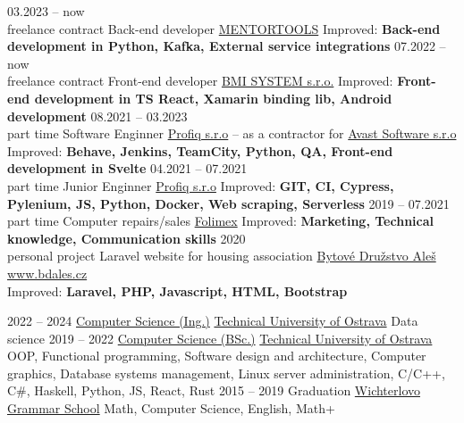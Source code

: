 \documentclass[9pt]{developercv} %
\begin{document}
\begin{entrylist}
        \entry
		{03.2023 -- now\\\footnotesize{freelance contract}}
		{Back-end developer}
		{\href{https://mentortools.com/}{MENTORTOOLS}}
		{Improved: \textbf{Back-end development in Python, Kafka, External service integrations}}
        \entry
		{07.2022 -- now\\\footnotesize{freelance contract}}
		{Front-end developer}
		{\href{http://www.bmisystem.cz/}{BMI SYSTEM s.r.o.}}
		{Improved: \textbf{Front-end development in TS React, Xamarin binding lib, Android development}}
	\entry
		{08.2021 -- 03.2023\\\footnotesize{part time}}
		{Software Enginner}
		{\href{https://www.profiq.com/}{Profiq s.r.o} -- as a contractor for \href{https://www.avast.com/index}{Avast Software s.r.o}}
		{Improved: \textbf{Behave, Jenkins, TeamCity, Python, QA, Front-end development in Svelte}}
	\entry
		{04.2021 -- 07.2021\\\footnotesize{part time}}
		{Junior Enginner}
		{\href{https://www.profiq.com/}{Profiq s.r.o}}
		{Improved: \textbf{GIT, CI, Cypress, Pylenium, JS, Python, Docker, Web scraping, Serverless}}
	\entry
		{2019 -- 07.2021\\\footnotesize{part time}}
		{Computer repairs/sales}
		{\href{https://www.folimex.cz/}{Folimex}}
		{Improved: \textbf{Marketing, Technical knowledge, Communication skills}}
	\entry
		{2020\\\footnotesize{personal project}}
		{Laravel website for housing association}
		{\href{www.bdales.cz}{Bytové Družstvo Aleš}}
		{\href{www.bdales.cz}{www.bdales.cz}\\Improved: \textbf{Laravel, PHP, Javascript, HTML, Bootstrap}}
\end{entrylist}


\begin{entrylist}
	\entry
		{2022 -- 2024}
		{\href{https://www.vsb.cz/en/ects/fei/?programmeId=1103&academicYearId=62}{Computer Science (Ing.)}}
		{\href{https://www.fei.vsb.cz/en/}{Technical University of Ostrava}}
		{Data science}
	\entry
		{2019 -- 2022}
		{\href{https://www.vsb.cz/en/ects/fei/?programmeId=771&academicYearId=62}{Computer Science (BSc.)}}
		{\href{https://www.fei.vsb.cz/en/}{Technical University of Ostrava}}
		{OOP, Functional programming, Software design and architecture, Computer graphics, Database systems management, Linux server administration, C/C++, C\#, Haskell, Python, JS, React, Rust}
	\entry
		{2015 -- 2019}
		{Graduation}
		{\href{www.wigym.cz/}{Wichterlovo Grammar School}}
		{Math, Computer Science, English, Math+}
\end{entrylist}
\end{document}
